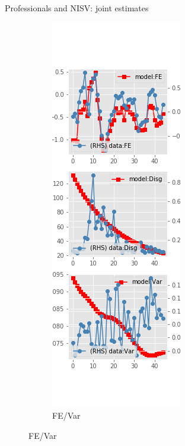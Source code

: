 \documentclass{beamer}
\begin{document}
\begin{frame}{Professionals and NISV: joint estimates}
	\begin{figure}[ht]
		\label{NISV_diag_joint_SPF}
		\begin{subfigure}[b]{0.2\textwidth}
			\centering
			\caption{FE/Var}
			\includegraphics[width=\textwidth, height = 0.8\textheight]{figuresDraft/spf_ni_est_sv_joint_diag0.png}

\end{subfigure}
\end{figure}
\end{frame}
\end{document}
